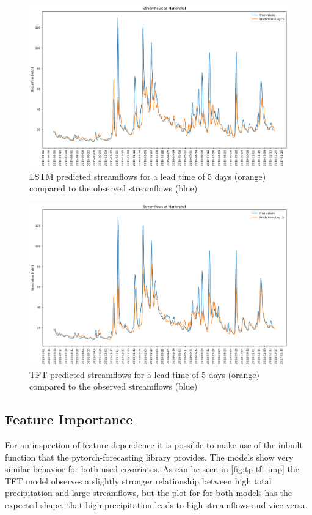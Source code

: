 \documentclass[
]{krantz}
\begin{document}
\begin{figure}

{\centering \includegraphics[width=0.8\linewidth]{work/07-hydroLSTM/images/lag5_lstm} 

}

\caption{LSTM predicted streamflows for a lead time of 5 days (orange) compared to the observed streamflows (blue)}\label{fig:lstm-pred}
\end{figure}

\begin{figure}

{\centering \includegraphics[width=0.8\linewidth]{work/07-hydroLSTM/images/lag5_tft} 

}

\caption{TFT predicted streamflows for a lead time of 5 days (orange) compared to the observed streamflows (blue)}\label{fig:tft-pred}
\end{figure}

\subsection{Feature Importance}\label{feature-importance}

For an inspection of feature dependence it is possible to make use of the inbuilt function that the pytorch-forecasting library provides. The models show very similar behavior for both used covariates. As can be seen in \ref{fig:tp-tft-imp} the TFT model observes a slightly stronger relationship between high total precipitation and large streamflows, but the plot for for both models has the expected shape, that high precipitation leads to high streamflows and vice versa.
\end{document}
